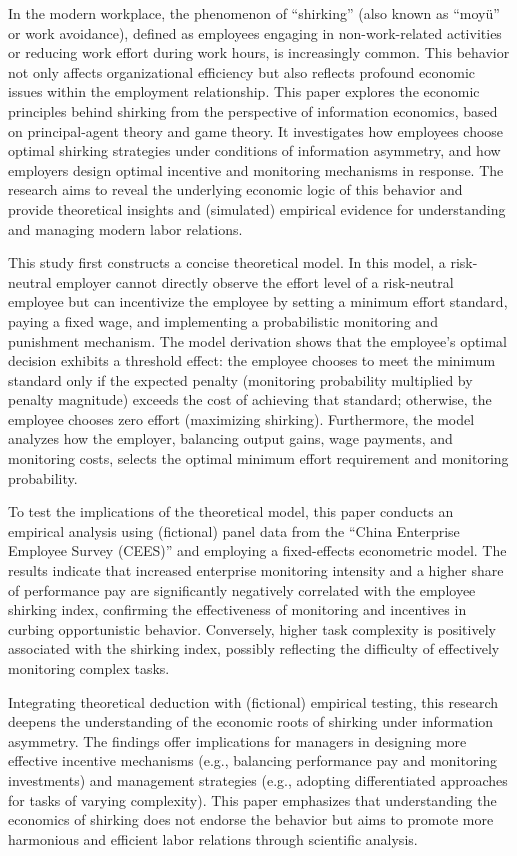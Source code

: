\begin{eabstract}
	In the modern workplace, the phenomenon of \enquote{shirking} (also known as \enquote{moyü} or work avoidance), defined as employees engaging in non-work-related activities or reducing work effort during work hours, is increasingly common. This behavior not only affects organizational efficiency but also reflects profound economic issues within the employment relationship. This paper explores the economic principles behind {shirking} from the perspective of {information economics}, based on {principal-agent theory} and {game theory}. It investigates how employees choose optimal {shirking} strategies under conditions of {information asymmetry}, and how employers design optimal {incentive} and {monitoring} mechanisms in response. The research aims to reveal the underlying economic logic of this behavior and provide theoretical insights and (simulated) empirical evidence for understanding and managing modern labor relations.

	This study first constructs a concise theoretical model. In this model, a risk-neutral employer cannot directly observe the effort level of a risk-neutral employee but can incentivize the employee by setting a minimum effort standard, paying a fixed wage, and implementing a probabilistic {monitoring} and punishment mechanism. The model derivation shows that the employee's optimal decision exhibits a threshold effect: the employee chooses to meet the minimum standard only if the expected penalty (monitoring probability multiplied by penalty magnitude) exceeds the cost of achieving that standard; otherwise, the employee chooses zero effort (maximizing shirking). Furthermore, the model analyzes how the employer, balancing output gains, wage payments, and monitoring costs, selects the optimal minimum effort requirement and monitoring probability.

	To test the implications of the theoretical model, this paper conducts an empirical analysis using (fictional) panel data from the \enquote{China Enterprise Employee Survey (CEES)} and employing a fixed-effects econometric model. The results indicate that increased enterprise {monitoring} intensity and a higher share of {performance pay} are significantly negatively correlated with the employee shirking index, confirming the effectiveness of {monitoring} and {incentives} in curbing opportunistic behavior. Conversely, higher task complexity is positively associated with the shirking index, possibly reflecting the difficulty of effectively monitoring complex tasks.

	Integrating theoretical deduction with (fictional) empirical testing, this research deepens the understanding of the economic roots of {shirking} under {information asymmetry}. The findings offer implications for managers in designing more effective {incentive} mechanisms (e.g., balancing performance pay and monitoring investments) and management strategies (e.g., adopting differentiated approaches for tasks of varying complexity). This paper emphasizes that understanding the economics of {shirking} does not endorse the behavior but aims to promote more harmonious and efficient labor relations through scientific analysis.
\end{eabstract}

